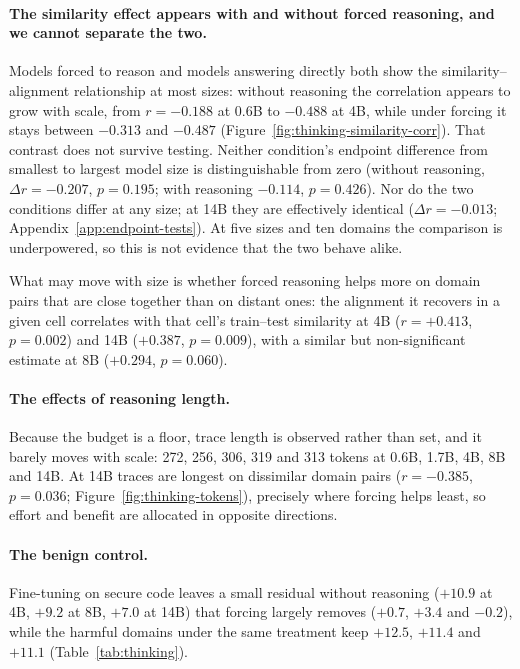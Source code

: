 \documentclass{article}
\begin{document}
\paragraph{The similarity effect appears with and without forced reasoning, and we cannot separate the two.}
Models forced to reason and models answering directly both show the
similarity--alignment relationship at most sizes: without reasoning the correlation appears to
grow with scale, from $r=-0.188$ at 0.6B to $-0.488$ at 4B, while under forcing it stays
between $-0.313$ and $-0.487$ (Figure~\ref{fig:thinking-similarity-corr}). That contrast does not survive testing. Neither condition's
endpoint difference from smallest to largest model size is distinguishable from zero (without reasoning, $\Delta r = -0.207$, $p=0.195$; with reasoning $-0.114$, $p=0.426$). Nor do the two conditions differ at any size; at 14B they are
effectively identical ($\Delta r = -0.013$; Appendix~\ref{app:endpoint-tests}). At five sizes and ten domains the comparison is underpowered, so this is not evidence that the two behave alike.

What may move with size is whether forced reasoning helps more on domain pairs that are
close together than on distant ones: the alignment it recovers in a given cell correlates with
that cell's train--test similarity at 4B ($r=+0.413$, $p=0.002$) and 14B ($+0.387$, $p=0.009$), with a similar but non-significant estimate at 8B ($+0.294$, $p=0.060$).



\paragraph{The effects of reasoning length.}
Because the budget is a floor, trace length is observed rather than set, and it barely moves
with scale: 272, 256, 306, 319 and 313 tokens at 0.6B, 1.7B, 4B, 8B and 14B. At 14B traces are
longest on dissimilar domain pairs ($r=-0.385$, $p=0.036$; Figure~\ref{fig:thinking-tokens}),
precisely where forcing helps least, so effort and benefit are allocated in opposite
directions.

\paragraph{The benign control.}
Fine-tuning on secure code leaves a small residual without reasoning ($+10.9$ at 4B, $+9.2$ at
8B, $+7.0$ at 14B) that forcing largely removes ($+0.7$, $+3.4$ and $-0.2$), while the harmful
domains under the same treatment keep $+12.5$, $+11.4$ and $+11.1$ (Table~\ref{tab:thinking}).
\end{document}
